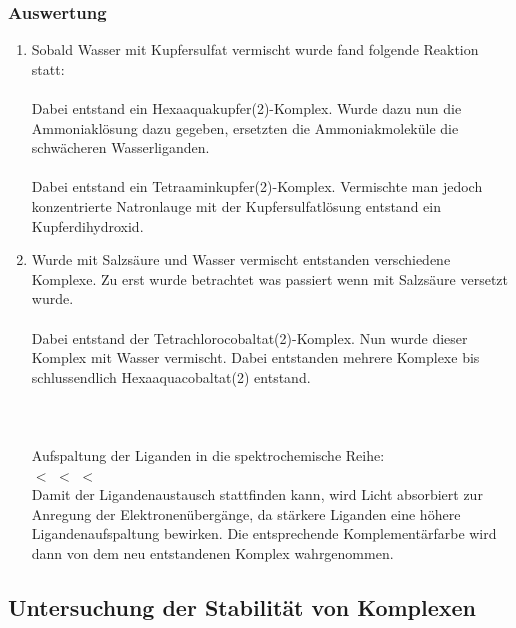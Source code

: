 \documentclass{scrartcl}
\begin{document}
\subsubsection{Auswertung}
\begin{enumerate}[label=\alph*)]
	\item Sobald Wasser mit Kupfersulfat vermischt wurde fand folgende Reaktion statt: \\
		 \\
Dabei entstand ein Hexaaquakupfer(2)-Komplex. Wurde dazu nun die Ammoniaklösung dazu gegeben, ersetzten die Ammoniakmoleküle die schwächeren Wasserliganden. \\ 
\\ 
Dabei entstand ein Tetraaminkupfer(2)-Komplex. Vermischte man jedoch konzentrierte Natronlauge mit der Kupfersulfatlösung entstand ein Kupferdihydroxid.\\ 
\item Wurde  mit Salzsäure und Wasser vermischt entstanden verschiedene Komplexe. Zu erst wurde betrachtet was passiert wenn  mit Salzsäure versetzt wurde.\\ 
 \\
Dabei entstand der Tetrachlorocobaltat(2)-Komplex. Nun wurde dieser Komplex mit Wasser vermischt. Dabei entstanden mehrere Komplexe bis schlussendlich Hexaaquacobaltat(2) entstand.\\ 
\\ 
\\
\\
Aufspaltung der Liganden in die spektrochemische Reihe:\\ 
 $<$  $<$  $<$  \\%
Damit der Ligandenaustausch stattfinden kann, wird Licht absorbiert zur Anregung der Elektronenübergänge, da stärkere Liganden eine höhere Ligandenaufspaltung bewirken. Die entsprechende Komplementärfarbe wird dann von dem neu entstandenen Komplex wahrgenommen.
\end{enumerate}
\subsection{Untersuchung der Stabilität von Komplexen}
\end{document}

